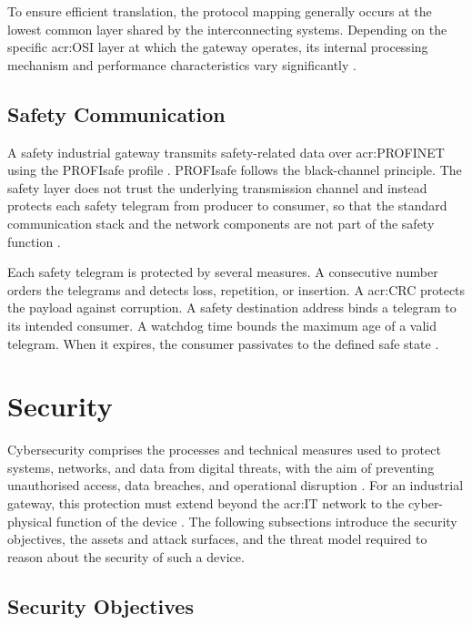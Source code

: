 To ensure efficient translation, the protocol mapping generally occurs at the lowest common layer shared by the interconnecting systems. Depending on the specific \gls{acr:OSI} layer at which the gateway operates, its internal processing mechanism and performance characteristics vary significantly \cite{hohn2026_gateway}.

\subsection{Safety Communication}
\label{subsec:black_channel}

A safety industrial gateway transmits safety-related data over \gls{acr:PROFINET} using the PROFIsafe profile \cite[p. 439]{Babel2024_profi}. PROFIsafe follows the black-channel principle. The safety layer does not trust the underlying transmission channel and instead protects each safety telegram from producer to consumer, so that the standard communication stack and the network components are not part of the safety function \cite{pi_profisafe}.

Each safety telegram is protected by several measures. A consecutive number orders the telegrams and detects loss, repetition, or insertion. A \gls{acr:CRC} protects the payload against corruption. A safety destination address binds a telegram to its intended consumer. A watchdog time bounds the maximum age of a valid telegram. When it expires, the consumer passivates to the defined safe state \cite{elintissar2026profisafe}.



\section{Security} 
\label{sec:cybersecurity_fundamentals} 

Cybersecurity comprises the processes and technical measures used to protect systems, networks, and data from digital threats, with the aim of preventing unauthorised access, data breaches, and operational disruption \cite{microsoft2026cybersecurity} \cite{ibm_cybersecurity}. For an industrial gateway, this protection must extend beyond the \gls{acr:IT} network to the cyber-physical function of the device \cite[p. 17]{835}. The following subsections introduce the security objectives, the assets and attack surfaces, and the threat model required to reason about the security of such a device.

\subsection{Security Objectives} 
\label{subsec:security_goals} 

